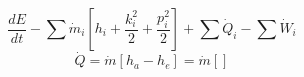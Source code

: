 

\item[d)] 
    \[
    \frac{dE}{dt} - \sum \dot{m}_i \left[ h_i + \frac{k_i^2}{2} + \frac{p_i^2}{2} \right] + \sum \dot{Q}_i - \sum \dot{W}_i
    \]
    \[
    \dot{Q} = \dot{m} \left[ h_a - h_e \right] = \dot{m} \left[ \right]
    \]